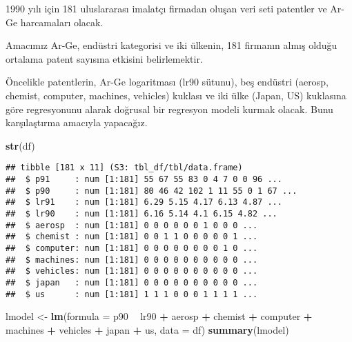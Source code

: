 \documentclass[
]{book}
\newenvironment{Shaded}{\begin{snugshade}}{\end{snugshade}}
\newcommand{\DataTypeTok}[1]{\textcolor[rgb]{0.13,0.29,0.53}{#1}}
\newcommand{\KeywordTok}[1]{\textcolor[rgb]{0.13,0.29,0.53}{\textbf{#1}}}
\newcommand{\NormalTok}[1]{#1}
\newcommand{\OperatorTok}[1]{\textcolor[rgb]{0.81,0.36,0.00}{\textbf{#1}}}
\newcommand{\StringTok}[1]{\textcolor[rgb]{0.31,0.60,0.02}{#1}}
\begin{document}
1990 yılı için 181 uluslararası imalatçı firmadan oluşan veri seti patentler ve Ar-Ge harcamaları olacak.

Amacımız Ar-Ge, endüstri kategorisi ve iki ülkenin, 181 firmanın almış olduğu ortalama patent sayısına etkisini belirlemektir.

Öncelikle patentlerin, Ar-Ge logaritması (lr90 sütunu), beş endüstri (aerosp, chemist, computer, machines, vehicles) kuklası ve iki ülke (Japan, US) kuklasına göre regresyonunu alarak doğrusal bir regresyon modeli kurmak olacak. Bunu karşılaştırma amacıyla yapacağız.

\begin{Shaded}
\begin{Highlighting}[]
\KeywordTok{str}\NormalTok{(df)}
\end{Highlighting}
\end{Shaded}

\begin{verbatim}
## tibble [181 x 11] (S3: tbl_df/tbl/data.frame)
##  $ p91     : num [1:181] 55 67 55 83 0 4 7 0 0 96 ...
##  $ p90     : num [1:181] 80 46 42 102 1 11 55 0 1 67 ...
##  $ lr91    : num [1:181] 6.29 5.15 4.17 6.13 4.87 ...
##  $ lr90    : num [1:181] 6.16 5.14 4.1 6.15 4.82 ...
##  $ aerosp  : num [1:181] 0 0 0 0 0 0 1 0 0 0 ...
##  $ chemist : num [1:181] 0 0 1 1 0 0 0 0 0 1 ...
##  $ computer: num [1:181] 0 0 0 0 0 0 0 0 1 0 ...
##  $ machines: num [1:181] 0 0 0 0 0 0 0 0 0 0 ...
##  $ vehicles: num [1:181] 0 0 0 0 0 0 0 0 0 0 ...
##  $ japan   : num [1:181] 0 0 0 0 0 0 0 0 0 0 ...
##  $ us      : num [1:181] 1 1 1 0 0 0 1 1 1 1 ...
\end{verbatim}

\begin{Shaded}
\begin{Highlighting}[]
\NormalTok{lmodel <-}\StringTok{ }\KeywordTok{lm}\NormalTok{(}\DataTypeTok{formula =}\NormalTok{ p90 }\OperatorTok{~}\StringTok{ }\NormalTok{lr90 }\OperatorTok{+}\StringTok{ }\NormalTok{aerosp }\OperatorTok{+}\StringTok{ }\NormalTok{chemist }\OperatorTok{+}\StringTok{ }\NormalTok{computer }\OperatorTok{+}\StringTok{ }\NormalTok{machines }\OperatorTok{+}\StringTok{ }\NormalTok{vehicles }\OperatorTok{+}\StringTok{ }\NormalTok{japan }\OperatorTok{+}\StringTok{ }\NormalTok{us, }\DataTypeTok{data =}\NormalTok{ df)}
\KeywordTok{summary}\NormalTok{(lmodel)}
\end{Highlighting}
\end{Shaded}
\end{document}
